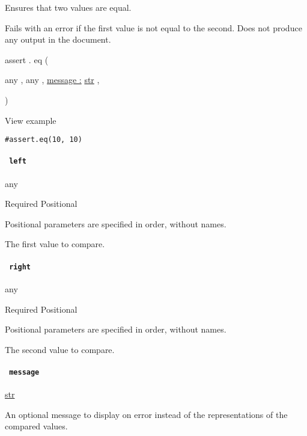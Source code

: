 Ensures that two values are equal.

Fails with an error if the first value is not equal to the second. Does
not produce any output in the document.

assert { . } { eq } (

{ { any } , } { { any } , } {
\hyperref[definitions-eq-parameters-message]{message :}
\href{/docs/reference/foundations/str/}{str} , }

)


View example

\begin{verbatim}
#assert.eq(10, 10)
\end{verbatim}

\paragraph{\texorpdfstring{\texttt{\ left\ }}{ left }}\label{definitions-eq-left}

{ any }

{Required} {{ Positional }}

\label{definitions-eq-left-positional-tooltip}
Positional parameters are specified in order, without names.

The first value to compare.

\paragraph{\texorpdfstring{\texttt{\ right\ }}{ right }}\label{definitions-eq-right}

{ any }

{Required} {{ Positional }}

\label{definitions-eq-right-positional-tooltip}
Positional parameters are specified in order, without names.

The second value to compare.

\paragraph{\texorpdfstring{\texttt{\ message\ }}{ message }}\label{definitions-eq-message}

\href{/docs/reference/foundations/str/}{str}

An optional message to display on error instead of the representations
of the compared values.

